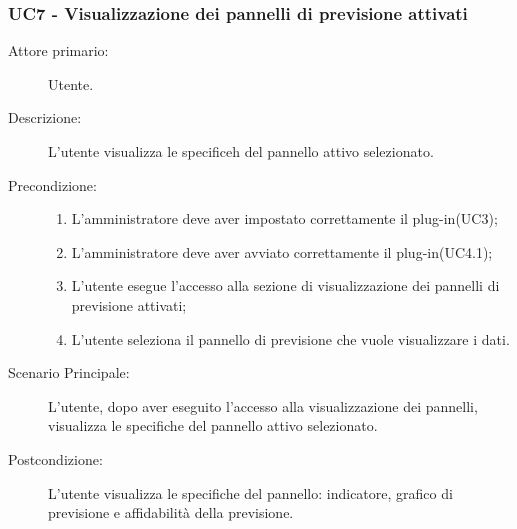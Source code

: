 \subsubsection{UC7 - Visualizzazione dei pannelli di previsione attivati}
\label{sssec:uc7}
\begin{description}
	\item[Attore primario:] Utente.
	\item[Descrizione:] L'utente visualizza le specificeh del pannello attivo selezionato.
	\item[Precondizione:]
	\begin{enumerate}
		\item L'amministratore deve aver impostato correttamente il plug-in(UC3);
		\item L'amministratore deve aver avviato correttamente il plug-in(UC4.1);
		\item L'utente esegue l'accesso alla sezione di visualizzazione dei pannelli di previsione attivati;
		\item L'utente seleziona il pannello di previsione che vuole visualizzare i dati.
	\end{enumerate}
	\item[Scenario Principale:] L'utente, dopo aver eseguito l'accesso alla visualizzazione dei pannelli, visualizza le specifiche del pannello attivo selezionato.
	\item[Postcondizione:] L'utente visualizza le specifiche del pannello: indicatore, grafico di previsione e affidabilità della previsione.
\end{description}
